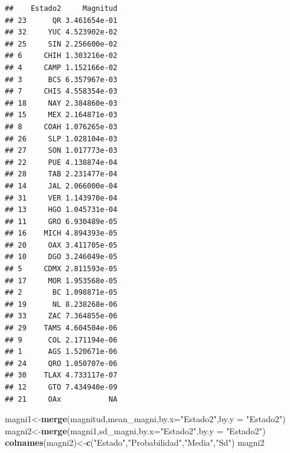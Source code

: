 \documentclass[
]{article}
\newenvironment{Shaded}{\begin{snugshade}}{\end{snugshade}}
\newcommand{\AttributeTok}[1]{\textcolor[rgb]{0.13,0.29,0.53}{#1}}
\newcommand{\FunctionTok}[1]{\textcolor[rgb]{0.13,0.29,0.53}{\textbf{#1}}}
\newcommand{\NormalTok}[1]{#1}
\newcommand{\OtherTok}[1]{\textcolor[rgb]{0.56,0.35,0.01}{#1}}
\newcommand{\StringTok}[1]{\textcolor[rgb]{0.31,0.60,0.02}{#1}}
\begin{document}
\begin{verbatim}
##    Estado2     Magnitud
## 23      QR 3.461654e-01
## 32     YUC 4.523902e-02
## 25     SIN 2.256600e-02
## 6     CHIH 1.303216e-02
## 4     CAMP 1.152166e-02
## 3      BCS 6.357967e-03
## 7     CHIS 4.558354e-03
## 18     NAY 2.384860e-03
## 15     MEX 2.164871e-03
## 8     COAH 1.076265e-03
## 26     SLP 1.028104e-03
## 27     SON 1.017773e-03
## 22     PUE 4.138874e-04
## 28     TAB 2.231477e-04
## 14     JAL 2.066000e-04
## 31     VER 1.143970e-04
## 13     HGO 1.045731e-04
## 11     GRO 6.930489e-05
## 16    MICH 4.894393e-05
## 20     OAX 3.411705e-05
## 10     DGO 3.246049e-05
## 5     CDMX 2.811593e-05
## 17     MOR 1.953568e-05
## 2       BC 1.098871e-05
## 19      NL 8.238268e-06
## 33     ZAC 7.364855e-06
## 29    TAMS 4.604504e-06
## 9      COL 2.171194e-06
## 1      AGS 1.520671e-06
## 24     QRO 1.050707e-06
## 30    TLAX 4.733117e-07
## 12     GTO 7.434940e-09
## 21     OAx           NA
\end{verbatim}

\begin{Shaded}
\begin{Highlighting}[]
\NormalTok{magni1}\OtherTok{\textless{}{-}}\FunctionTok{merge}\NormalTok{(magnitud,mean\_magni,}\AttributeTok{by.x=}\StringTok{"Estado2"}\NormalTok{,}\AttributeTok{by.y =} \StringTok{"Estado2"}\NormalTok{)}
\NormalTok{magni2}\OtherTok{\textless{}{-}}\FunctionTok{merge}\NormalTok{(magni1,sd\_magni,}\AttributeTok{by.x=}\StringTok{"Estado2"}\NormalTok{,}\AttributeTok{by.y =} \StringTok{"Estado2"}\NormalTok{)}
\FunctionTok{colnames}\NormalTok{(magni2)}\OtherTok{\textless{}{-}}\FunctionTok{c}\NormalTok{(}\StringTok{"Estado"}\NormalTok{,}\StringTok{"Probabilidad"}\NormalTok{,}\StringTok{"Media"}\NormalTok{,}\StringTok{"Sd"}\NormalTok{)}
\NormalTok{magni2}
\end{Highlighting}
\end{Shaded}
\end{document}
